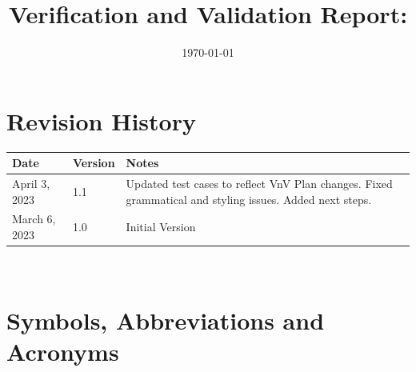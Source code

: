 \documentclass[12pt, titlepage]{article}
\begin{document}
\title{Verification and Validation Report: \progname} 
\author{\authname}
\date{\today}
	
\maketitle


\section{Revision History}

\begin{tabularx}{\textwidth}{p{3cm}p{2cm}X}
\toprule {\bf Date} & {\bf Version} & {\bf Notes}\\
\midrule
April 3, 2023 & 1.1 & Updated test cases to reflect VnV Plan changes. Fixed grammatical and styling issues. Added next steps.\\
\midrule
March 6, 2023 & 1.0 & Initial Version\\
\bottomrule
\end{tabularx}

~\newpage

\section{Symbols, Abbreviations and Acronyms}

\renewcommand{\arraystretch}{1.2}
\end{document}
